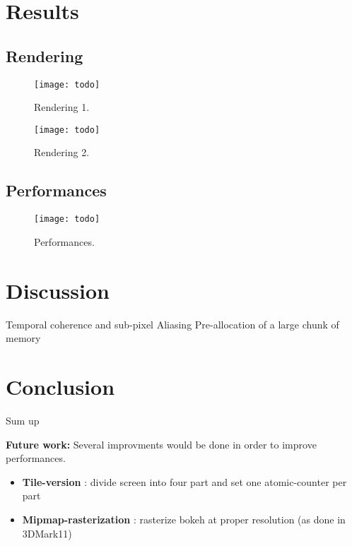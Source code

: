 \section{Results}

\subsection{Rendering}
	\begin{figure}[htb]\centering
	\texttt{[image: todo]}
	\caption{Rendering 1.}
	\label{YourName:fig1}
	\end{figure}

	\begin{figure}[htb]\centering
	\texttt{[image: todo]}
	\caption{Rendering 2.}
	\label{YourName:fig1}
	\end{figure}

\subsection{Performances}
	\begin{figure}[htb]\centering
	\texttt{[image: todo]}
	\caption{Performances.}
	\label{YourName:fig1}
	\end{figure}

\section{Discussion}
Temporal coherence and sub-pixel Aliasing
Pre-allocation of a large chunk of memory

\section{Conclusion}
Sum up

\textbf{Future work:} Several improvments would be done in order to improve performances. 
\begin{itemize}
	\item \textbf{Tile-version} : divide screen into four part and set one atomic-counter per part
	\item \textbf{Mipmap-rasterization} : rasterize bokeh at proper resolution (as done in 3DMark11)
\end{itemize}














